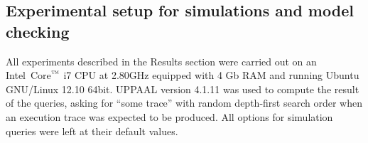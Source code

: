 \documentclass{bmcart}
\begin{document}
\subsection*{Experimental setup for simulations and model checking}
All experiments described in the Results section
were carried out on an Intel\circledR\ Core$^{\mbox{\scriptsize\texttrademark}}$ i7 CPU at 2.80GHz equipped with 4 Gb RAM
and running Ubuntu GNU/Linux 12.10 64bit.
UPPAAL version 4.1.11 was used to compute the result of the queries, asking for ``some trace'' with random depth-first search order
when an execution trace was expected to be produced. All options for simulation queries were left at their default values.










\end{document}
